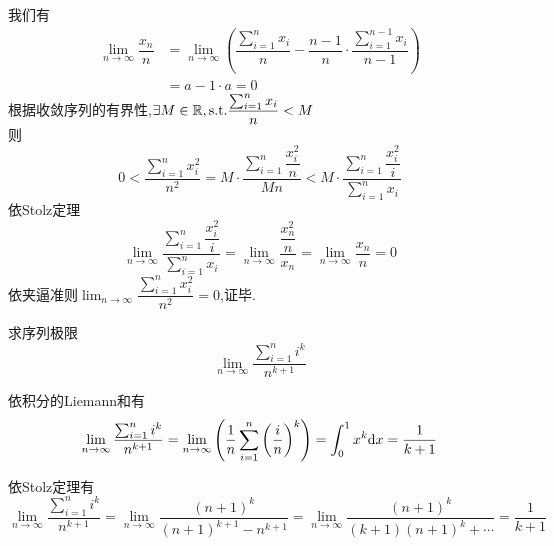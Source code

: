 \documentclass[a4paper]{ctexart}
\begin{document}
\begin{solution}[Proof.]
    我们有
    \begin{align*}
    \lim_{n\to\infty}{\dfrac{x_n}{n}} 
    &= \lim_{n\to\infty}{\left(\dfrac{\sum_{i=1}^{n}{x_i}}{n}-\dfrac{n-1}{n}\cdot\dfrac{\sum_{i=1}^{n-1}{x_i}}{n-1}\right)} \\
    &= a-1\cdot a= 0
    \end{align*}
    根据收敛序列的有界性,$\exists M\in\mathbb{R},\text{s.t.}\dfrac{\sum_{i=1}^{n}{x_i}}{n}<M$\\
    则$$0<\dfrac{\sum_{i=1}^{n}{x_i^2}}{n^2}=M\cdot\dfrac{\sum_{i=1}^{n}{\dfrac{x_i^2}{n}}}{Mn}<M\cdot\dfrac{\sum_{i=1}^{n}{\dfrac{x_i^2}{i}}}{\sum_{i=1}^{n}{x_i}}$$
    依Stolz定理$$\lim_{n\to\infty}{\dfrac{\sum_{i=1}^{n}{\dfrac{x_i^2}{i}}}{\sum_{i=1}^{n}{x_i}}}=\lim_{n\to\infty}{\dfrac{\dfrac{x_n^2}{n}}{x_n}}=\lim_{n\to\infty}{\dfrac{x_n}{n}}=0$$
    依夹逼准则$\displaystyle\lim_{n\to\infty}{\dfrac{\sum_{i=1}^{n}{x_i^2}}{n^2}}=0$,证毕.\\
\end{solution}
\begin{problem}[例2.]
    求序列极限$$\lim_{n\to\infty}{\dfrac{\sum_{i=1}^n{i^k}}{n^{k+1}}}$$
\end{problem}
\begin{solution}
    依积分的Liemann和有$$\lim_{n\to\infty}{\dfrac{\sum_{i=1}^n{i^k}}{n^{k+1}}}=\lim_{n\to\infty}{\left(\dfrac{1}{n}\sum_{i=1}^{n}{\left(\dfrac{i}{n}\right)^k}\right)}=\int_0^1{x^k\mathrm{d} x}=\dfrac{1}{k+1}$$
\end{solution}
\begin{solution}
    依Stolz定理有$$\lim_{n\to\infty}{\dfrac{\sum_{i=1}^n{i^k}}{n^{k+1}}}=\lim_{n\to\infty}{\dfrac{(n+1)^k}{(n+1)^{k+1}-n^{k+1}}}=\lim_{n\to\infty}{\dfrac{(n+1)^k}{(k+1)(n+1)^k+\cdots}}=\dfrac{1}{k+1}$$
\end{solution}
\end{document}
